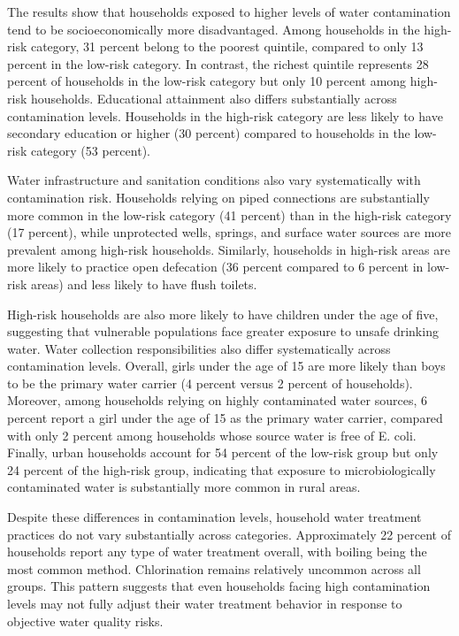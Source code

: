 \documentclass [11pt]{article}
\theoremstyle{plain}
\theoremstyle{definition}
\theoremstyle{remark}
\newcommand{\1}{\bm{1}}
\begin{document}
{\renewcommand\normalsize{}\normalsize\singlespacing  
}

The results show that households exposed to higher levels of water contamination tend to be socioeconomically more disadvantaged. Among households in the high-risk category, 31 percent belong to the poorest quintile, compared to only 13 percent in the low-risk category. In contrast, the richest quintile represents 28 percent of households in the low-risk category but only 10 percent among high-risk households. Educational attainment also differs substantially across contamination levels. Households in the high-risk category are less likely to have secondary education or higher (30 percent) compared to households in the low-risk category (53 percent).

Water infrastructure and sanitation conditions also vary systematically with contamination risk. Households relying on piped connections are substantially more common in the low-risk category (41 percent) than in the high-risk category (17 percent), while unprotected wells, springs, and surface water sources are more prevalent among high-risk households. Similarly, households in high-risk areas are more likely to practice open defecation (36 percent compared to 6 percent in low-risk areas) and less likely to have flush toilets. 

High-risk households are also more likely to have children under the age of five, suggesting that vulnerable populations face greater exposure to unsafe drinking water. Water collection responsibilities also differ systematically across contamination levels. Overall, girls under the age of 15 are more likely than boys to be the primary water carrier (4 percent versus 2 percent of households). Moreover, among households relying on highly contaminated water sources, 6 percent report a girl under the age of 15 as the primary water carrier, compared with only 2 percent among households whose source water is free of E. coli. Finally, urban households account for 54 percent of the low-risk group but only 24 percent of the high-risk group, indicating that exposure to microbiologically contaminated water is substantially more common in rural areas.

Despite these differences in contamination levels, household water treatment practices do not vary substantially across categories. Approximately 22 percent of households report any type of water treatment overall, with boiling being the most common method. Chlorination remains relatively uncommon across all groups. This pattern suggests that even households facing high contamination levels may not fully adjust their water treatment behavior in response to objective water quality risks.
\end{document}
